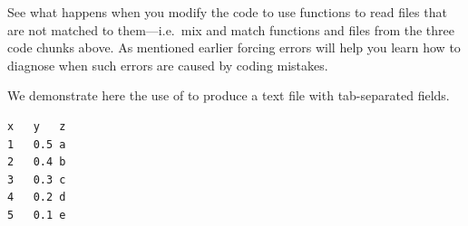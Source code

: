 \documentclass[krantz2]{krantz}\usepackage{knitr}%
\begin{document}
\begin{playground}
See what happens when you modify the code to use  functions to read files that are not matched to them---i.e.\ mix and match functions and files from the three code chunks above. As mentioned earlier forcing errors will help you learn how to diagnose when such errors are caused by coding mistakes.
\end{playground}

We demonstrate here the use of  to produce a text file with tab-separated fields.
\begin{knitrout}\footnotesize
{}\color{fgcolor}\begin{kframe}
\begin{alltt}
  \hlstd{=} \hlstd{)}
\hlstd{(}\hlstd{,}  \hlstd{=} \hlstd{)}
\end{alltt}
\end{kframe}
\end{knitrout}

\begin{knitrout}\footnotesize
{}\color{fgcolor}\begin{kframe}
\begin{verbatim}
x	y	z
1	0.5	a
2	0.4	b
3	0.3	c
4	0.2	d
5	0.1	e
\end{verbatim}
\end{kframe}
\end{knitrout}
\end{document}
